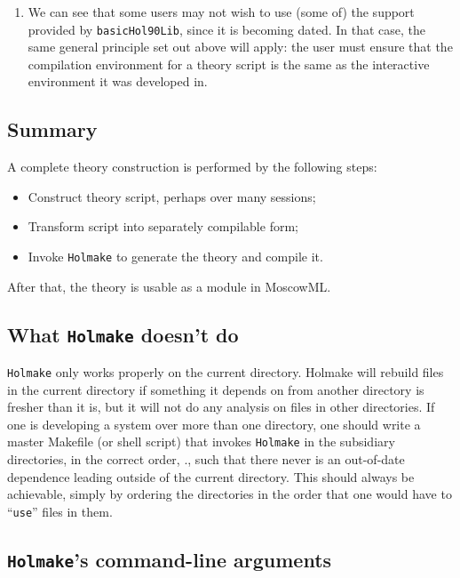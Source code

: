 \documentclass[12pt,fleqn,a4paper]{report}
\begin{document}
\begin{enumerate}
\item We can see that some users may not wish to use (some of) the
  support provided by \verb+basicHol90Lib+, since it is becoming
  dated. In that case, the same general principle set out above will
  apply: the user must ensure that the compilation environment for a
  theory script is the same as the interactive environment it was
  developed in.

\end{enumerate}

\subsection{Summary}

A complete theory construction is performed by the following steps:
\begin{itemize}
\item Construct theory script, perhaps over many sessions;
\item Transform script into separately compilable form;
\item Invoke {\tt Holmake} to generate the theory and compile it.
\end{itemize}

After that, the theory is usable as a module in MoscowML.


\subsection{What {\tt Holmake} doesn't do}

{\tt Holmake} only works properly on the current directory.  Holmake
will rebuild files in the current directory if something it depends on
from another directory is fresher than it is, but it will not do any
analysis on files in other directories.  If one is developing a system
over more than one directory, one should write a master Makefile (or
shell script) that invokes {\tt Holmake} in the subsidiary
directories, in the correct order, \ie., such that there never is an
out-of-date dependence leading outside of the current directory. This
should always be achievable, simply by ordering the directories in the
order that one would have to ``\verb+use+'' files in them.

\subsection{{\tt Holmake}'s command-line arguments}
\end{document}
